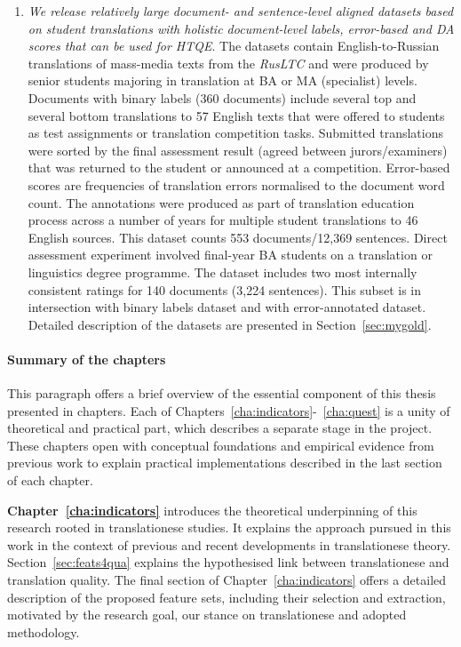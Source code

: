 \begin{enumerate}
	\item \textit{We release relatively large document- and sentence-level aligned datasets based on student translations with holistic document-level labels, error-based and DA scores that can be used for \gls{HTQE}}.
	The datasets contain English-to-Russian translations of mass-media texts from the \textit{RusLTC} and were produced by senior students majoring in translation at BA or MA (specialist) levels. 
	Documents with binary labels (360 documents) include several top and several bottom translations to 57 English texts that were offered to students as test assignments or translation competition tasks. Submitted translations were sorted by the final assessment result (agreed between jurors/examiners) that was returned to the student or announced at a competition.
	Error-based scores are frequencies of translation errors normalised to the document word count. The annotations were produced as part of translation education process across a number of years for multiple student translations to 46 English sources. This dataset counts 553 documents/12,369 sentences.
	Direct assessment experiment involved final-year BA students on a translation or linguistics degree programme. The dataset includes two most internally consistent ratings for 140 documents (3,224 sentences). This subset is in intersection with binary labels dataset and with error-annotated dataset.
	Detailed description of the datasets are presented in Section~\ref{sec:mygold}.
	
\end{enumerate}
\paragraph{Summary of the chapters}
This paragraph offers a brief overview of the essential component of this thesis presented in chapters.
Each of Chapters~\ref{cha:indicators}-~\ref{cha:quest} is a unity of theoretical and practical part, which describes a separate stage in the project. These chapters open with conceptual foundations and empirical evidence from previous work to explain practical implementations described in the last section of each chapter. 

\textbf{Chapter~\ref{cha:indicators}} introduces the theoretical underpinning of this research rooted in translationese studies. It explains the approach pursued in this work in the context of previous and recent developments in translationese theory.
Section~\ref{sec:feats4qua} explains the hypothesised link between translationese and translation quality. The final section of Chapter~\ref{cha:indicators} offers a detailed description of the proposed feature sets, including their selection and extraction, motivated by the research goal, our stance on translationese and adopted methodology.

